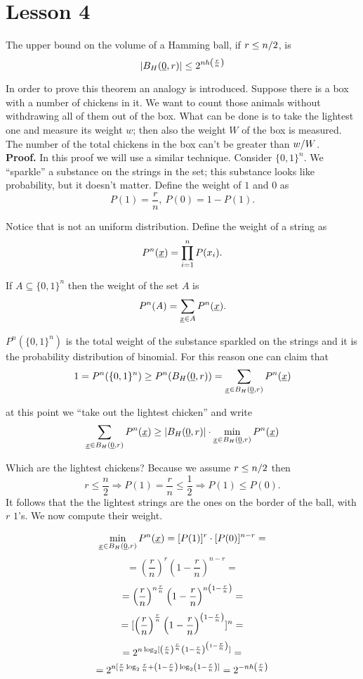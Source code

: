 \section{Lesson 4}

\begin{thm}
	The upper bound on the volume of a Hamming ball, if $ r \leq {n}/{2}$, is
	$$|B_H(\underline{0}, r)| \leq 2^{nh\left(\frac{r}{n}\right)}$$
\end{thm}

In order to prove this theorem an analogy is introduced. Suppose there is a box with a number of chickens in it. We want to count those animals without withdrawing all of them out of the box. What can be done is to take the lightest one and measure its weight $w$; then also the weight $W$ of the box is measured. The number of the total chickens in the box can't be greater than ${w}/{W}$.\\

\noindent\textbf{Proof.} In this proof we will use a similar technique. Consider $\{0, 1\}^n$. We ``sparkle'' a substance on the strings in the set; this substance looks like probability, but it doesn't matter. Define the weight of $1$ and $0$ as 
$$P(1) = \dfrac{r}{n},\ P(0) = 1 - P(1).$$

Notice that is not an uniform distribution. Define the weight of a string as
$$P^n(\underline{x}) = \prod_{i = 1}^n P(x_i).$$

If $A \subseteq \{0, 1\}^n$ then the weight of the set $A$ is $$P^n(A) = \sum_{\underline{x} \in A} P^n(\underline{x}).$$

$P^n(\{0, 1\}^n)$ is the total weight of the substance sparkled on the strings and it is the probability distribution of binomial. For this reason one can claim that
$$1 = P^n(\{0, 1\}^n) \geq P^n(B_H(\underline{0}, r)) = \sum_{\underline{x} \in B_H(\underline{0}, r)} P^n(\underline{x})$$

at this point we ``take out the lightest chicken'' and write
$$\sum_{\underline{x} \in B_H(\underline{0}, r)} P^n(\underline{x}) \geq |B_H(\underline{0}, r)| \cdot \min_{\underline{x} \in B_H(\underline{0}, r)}P^n(\underline{x})$$

Which are the lightest chickens? Because we assume $r \leq {n}/{2}$ then
$$r \leq \dfrac{n}{2} \Rightarrow P(1) = \dfrac{r}{n} \leq \dfrac{1}{2} \Rightarrow P(1) \leq P(0).$$
It follows that the the lightest strings are the ones on the border of the ball, with $r$ $1$'s. We now compute their weight.

\[\min_{\underline{x} \in B_H(\underline{0}, r)}P^n(\underline{x}) = [P(1)]^r\cdot[P(0)]^{n-r} = \] 
\[ = \left(\dfrac{r}{n}\right)^r \left(1 - \dfrac{r}{n}\right)^{n-r} = \]  \[ = \left(\dfrac{r}{n}\right)^{n\frac{r}{n}} \left(1 - \dfrac{r}{n}\right)^{n\left(1 - \frac{r}{n}\right)} =\]
\[ = [\left(\dfrac{r}{n}\right)^{\frac{r}{n}} \left(1 - \dfrac{r}{n}\right)^{\left(1 - \frac{r}{n}\right)}]^n =\] 
\[ =2^{n\log_2[\left(\frac{r}{n}\right)^{\frac{r}{n}}  \left(1 - \frac{r}{n}\right)^{\left(1 - \frac{r}{n}\right)}]} = \]
\[ =2^{n[\frac{r}{n}\log_2\frac{r}{n} + \left(1 - \frac{r}{n}\right)\log_2\left(1 - \frac{r}{n}\right)]} = 2^{-nh\left(\frac{r}{n}\right)}\]

